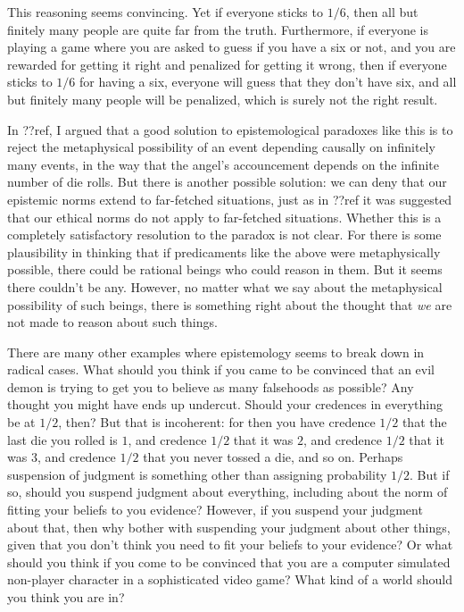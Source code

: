 This reasoning seems convincing. Yet if everyone sticks to $1/6$, then all but finitely many people are quite far 
from the truth. Furthermore, if everyone is playing a game where you are asked to guess if you have a six or not,
and you are rewarded for getting it right and penalized for getting it wrong, then if everyone sticks to $1/6$
for having a six, everyone will guess that they don't have six, and all but finitely many people will be penalized,
which is surely not the right result.

In ??ref, I argued that a good solution to epistemological paradoxes like this is to reject the metaphysical possibility
of an event depending causally on infinitely many events, in the way that the angel's accouncement depends on the infinite
number of die rolls. But there is another possible solution: we can deny that our epistemic norms extend to far-fetched
situations, just as in ??ref it was suggested that our ethical norms do not apply to far-fetched situations. Whether this is 
a completely satisfactory resolution to the paradox is not clear. For there is some plausibility in thinking that if 
predicaments like the above were metaphysically possible, there could be rational beings who could reason
in them. But it seems there couldn't be any. However, no matter what we say about the metaphysical possibility of such beings,
there is something right about the thought that \textit{we} are not made to reason about such things.

There are many other examples where epistemology seems to break down in radical cases. What should you think if you came to be
convinced that an evil demon is trying to get you to believe as many falsehoods as possible? Any thought you might have ends
up undercut. Should your credences in everything be at $1/2$, then? But that is incoherent: for then you have credence $1/2$
that the last die you rolled is $1$, and credence $1/2$ that it was $2$, and credence $1/2$ that it was $3$, and credence $1/2$
that you never tossed a die, and so on. Perhaps suspension of judgment is something other than assigning probability $1/2$. But 
if so, should you suspend judgment about everything, including about the norm of fitting your beliefs to you evidence? However,
if you suspend your judgment about that, then why bother with suspending your judgment about other things, given that you don't 
think you need to fit your beliefs to your evidence? Or what should you think if you come to be convinced that you are a computer 
simulated non-player character in a sophisticated video game? What kind of a world should you think you are in? 


